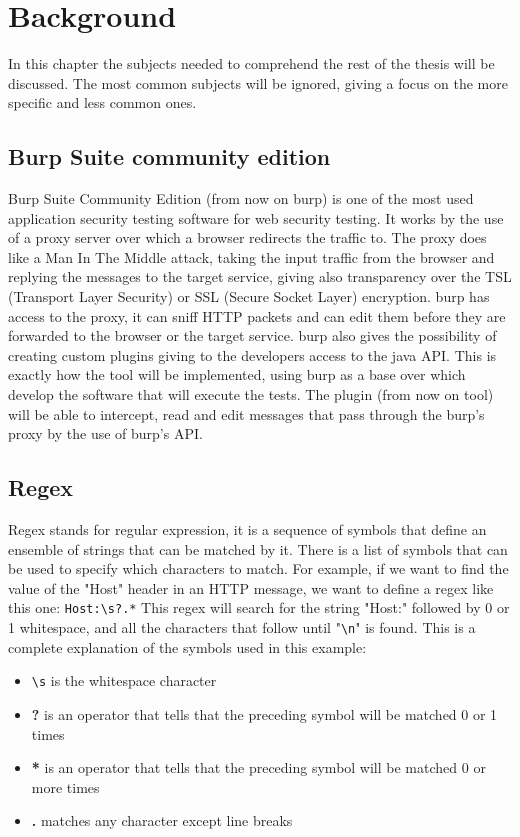 \chapter{Background}
In this chapter the subjects needed to comprehend the rest of the thesis will be discussed. The most common subjects will be ignored, giving a focus on the more specific and less common ones.

\section{Burp Suite community edition}
Burp Suite Community Edition (from now on \Gls{burp}) is one of the most used application security testing software for web security testing. It works by the use of a proxy server over which a browser redirects the traffic to. The proxy does like a Man In The Middle attack, taking the input traffic from the browser and replying the messages to the target service, giving also transparency over the TSL (Transport Layer Security) or SSL (Secure Socket Layer) encryption. \Gls{burp} has access to the proxy, it can sniff HTTP packets and can edit them before they are forwarded to the browser or the target service. \Gls{burp} also gives the possibility of creating custom plugins giving to the developers access to the java API. This is exactly how the tool will be implemented, using \Gls{burp} as a base over which develop the software that will execute the tests. The plugin (from now on tool) will be able to intercept, read and edit messages that pass through the \Gls{burp}'s proxy by the use of \Gls{burp}'s API.

\section{Regex}
Regex stands for regular expression, it is a sequence of symbols that define an ensemble of strings that can be matched by it. There is a list of symbols that can be used to specify which characters to match. For example, if we want to find the value of the "Host" header in an HTTP message, we want to define a regex like this one: \verb|Host:\s?.*|
This regex will search for the string "Host:" followed by 0 or 1 whitespace, and all the characters that follow until "\verb|\n|" is found. This is a complete explanation of the symbols used in this example:
\begin{itemize}
    \item \verb|\s| is the whitespace character
    \item \textbf{?} is an operator that tells that the preceding symbol will be matched 0 or 1 times
    \item \textbf{*} is an operator that tells that the preceding symbol will be matched 0 or more times
    \item \textbf{.} matches any character except line breaks
\end{itemize}

